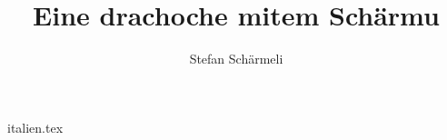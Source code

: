 \documentclass[a5paper,BCOR=12mm,german]{scrbook}
\begin{document}
    \title{Eine drachoche mitem Schärmu}
    \author{Stefan Schärmeli}
    \frontmatter
    \maketitle
    \tableofcontents
    \mainmatter
    {italien.tex}
    \backmatter
\end{document}
